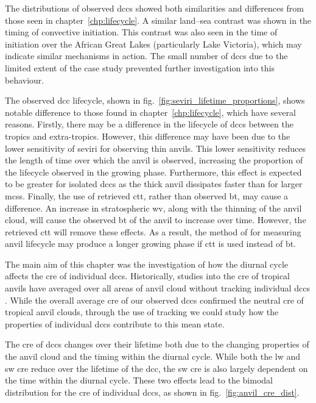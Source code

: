 The distributions of observed \acrshort{dcc}s showed both similarities and differences from those seen in chapter~\ref{chp:lifecycle}.
A similar land--sea contrast was shown in the timing of convective initiation.
This contrast was also seen in the time of initiation over the African Great Lakes (particularly Lake Victoria), which may indicate similar mechanisms in action.
The small number of \acrshort{dcc}s due to the limited extent of the case study prevented further investigation into this behaviour.

The observed \acrshort{dcc} lifecycle, shown in fig.~\ref{fig:seviri_lifetime_proportions}, shows notable difference to those found in chapter~\ref{chp:lifecycle}, which have several reasons.
Firstly, there may be a difference in the lifecycle of \acrshort{dcc}s between the tropics and extra-tropics.
However, this difference may have been due to the lower sensitivity of \acrshort{seviri} for observing thin anvils.
This lower sensitivity reduces the length of time over which the anvil is observed, increasing the proportion of the lifecycle observed in the growing phase.
Furthermore, this effect is expected to be greater for isolated \acrshort{dcc}s as the thick anvil dissipates faster than for larger \acrshort{mcs}s.
Finally, the use of retrieved \acrshort{ctt}, rather than observed \acrshort{bt}, may cause a difference.
An increase in stratospheric \acrshort{wv}, along with the thinning of the anvil cloud, will cause the observed \acrshort{bt} of the anvil to increase over time.
However, the retrieved \acrshort{ctt} will remove these effects.
As a result, the method of \citet{futyan_deep_2007} for measuring anvil lifecycle may produce a longer growing phase if \acrshort{ctt} is used instead of \acrshort{bt}.

The main aim of this chapter was the investigation of how the diurnal cycle affects the \acrshort{cre} of individual \acrshort{dcc}s.
Historically, studies into the \acrshort{cre} of tropical anvils have averaged over all areas of anvil cloud without tracking individual \acrshort{dcc}s \citep{ramanathan_cloud-radiative_1989, hartmann_effect_1992, stephens_cloudsat_2018}.
While the overall average \acrshort{cre} of our observed \acrshort{dcc}s confirmed the neutral \acrshort{cre} of tropical anvil clouds, through the use of tracking we could study how the properties of individual \acrshort{dcc}s contribute to this mean state.

The \acrshort{cre} of \acrshort{dcc}s changes over their lifetime both due to the changing properties of the anvil cloud and the timing within the diurnal cycle.
While both the \acrshort{lw} and \acrshort{sw} \acrshort{cre} reduce over the lifetime of the \acrshort{dcc}, the \acrshort{sw} \acrshort{cre} is also largely dependent on the time within the diurnal cycle.
These two effects lead to the bimodal distribution for the \acrshort{cre} of individual \acrshort{dcc}s, as shown in fig.~\ref{fig:anvil_cre_dist}.

